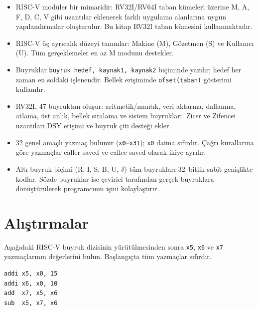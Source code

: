 \begin{itemize}
\item RISC-V modüler bir mimaridir: RV32I/RV64I taban kümeleri üzerine M, A, F, D, C, V gibi uzantılar eklenerek farklı uygulama alanlarına uygun yapılandırmalar oluşturulur. Bu kitap RV32I taban kümesini kullanmaktadır.

\item RISC-V üç ayrıcalık düzeyi tanımlar: Makine (M), Gözetmen (S) ve Kullanıcı (U). Tüm gerçeklemeler en az M modunu destekler.

\item Buyruklar \texttt{buyruk hedef, kaynak1, kaynak2} biçiminde yazılır; hedef her zaman en soldaki işlenendir. Bellek erişiminde \texttt{ofset(taban)} gösterimi kullanılır.

\item RV32I, 47 buyruktan oluşur: aritmetik/mantık, veri aktarma, dallanma, atlama, üst anlık, bellek sıralama ve sistem buyrukları. Zicsr ve Zifencei uzantıları DSY erişimi ve buyruk çiti desteği ekler.

\item 32 genel amaçlı yazmaç bulunur (\texttt{x0}--\texttt{x31}); \texttt{x0} daima sıfırdır. Çağrı kurallarına göre yazmaçlar caller-saved ve callee-saved olarak ikiye ayrılır.

\item Altı buyruk biçimi (R, I, S, B, U, J) tüm buyrukları 32~bitlik sabit genişlikte kodlar. Sözde buyruklar ise çevirici tarafından gerçek buyruklara dönüştürülerek programcının işini kolaylaştırır.
\end{itemize}


\section*{Alıştırmalar}
\label{sec:ekC-alistirmalar}

\begin{alistirma}[\kolay]
Aşağıdaki RISC-V buyruk dizisinin yürütülmesinden sonra \texttt{x5}, \texttt{x6} ve \texttt{x7} yazmaçlarının değerlerini bulun. Başlangıçta tüm yazmaçlar sıfırdır.
\begin{lstlisting}[style=riscv, style=alistirma-kod]
addi x5, x0, 15
addi x6, x0, 10
add  x7, x5, x6
sub  x5, x7, x6
\end{lstlisting}
\end{alistirma}

